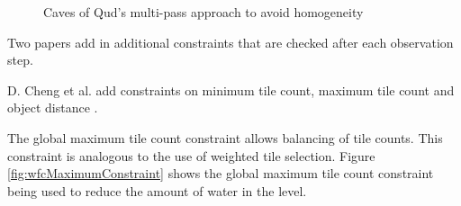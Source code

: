 \begin{figure}[H]
    \centering
    \hfill
    \caption{Caves of Qud's multi-pass approach to avoid homogeneity \cite{GDC_caves_of_qud}}
    \label{fig:cavesOfQudWFCHomogeneity}
\end{figure}

Two papers add in additional constraints that are checked after each observation step.

D. Cheng et al. add constraints on minimum tile count, maximum tile count and object distance \cite{WFC_Automatic_Rules_And_Better_Symmetries}.

The global maximum tile count constraint allows balancing of tile counts. This constraint is analogous to the use of weighted tile selection. Figure \ref{fig:wfcMaximumConstraint} shows the global maximum tile count constraint being used to reduce the amount of water in the level.

